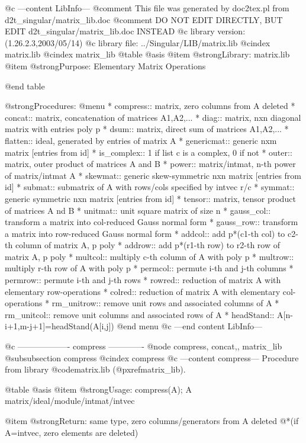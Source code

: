 @c ---content LibInfo---
@comment This file was generated by doc2tex.pl from d2t_singular/matrix_lib.doc
@comment DO NOT EDIT DIRECTLY, BUT EDIT d2t_singular/matrix_lib.doc INSTEAD
@c library version: (1.26.2.3,2003/05/14)
@c library file: ../Singular/LIB/matrix.lib
@cindex matrix.lib
@cindex matrix_lib
@table @asis
@item @strong{Library:}
matrix.lib
@item @strong{Purpose:}
    Elementary Matrix Operations

@end table

@strong{Procedures:}
@menu
* compress:: matrix, zero columns from A deleted
* concat:: matrix, concatenation of matrices A1,A2,...
* diag:: matrix, nxn diagonal matrix with entries poly p
* dsum:: matrix, direct sum of matrices A1,A2,...
* flatten:: ideal, generated by entries of matrix A
* genericmat:: generic nxm matrix [entries from id]
* is_complex:: 1 if list c is a complex, 0 if not
* outer:: matrix, outer product of matrices A and B
* power:: matrix/intmat, n-th power of matrix/intmat A
* skewmat:: generic skew-symmetric nxn matrix [entries from id]
* submat:: submatrix of A with rows/cols specified by intvec r/c
* symmat:: generic symmetric nxn matrix [entries from id]
* tensor:: matrix, tensor product of matrices A nd B
* unitmat:: unit square matrix of size n
* gauss_col:: transform a matrix into col-reduced Gauss normal form
* gauss_row:: transform a matrix into row-reduced Gauss normal form
* addcol:: add p*(c1-th col) to c2-th column of matrix A, p poly
* addrow:: add p*(r1-th row) to r2-th row of matrix A, p poly
* multcol:: multiply c-th column of A with poly p
* multrow:: multiply r-th row of A with poly p
* permcol:: permute i-th and j-th columns
* permrow:: permute i-th and j-th rows
* rowred:: reduction of matrix A with elementary row-operations
* colred:: reduction of matrix A with elementary col-operations
* rm_unitrow:: remove unit rows and associated columns of A
* rm_unitcol:: remove unit columns and associated rows of A
* headStand:: A[n-i+1,m-j+1]=headStand(A[i,j])
@end menu
@c ---end content LibInfo---

@c ------------------- compress -------------
@node compress, concat,, matrix_lib
@subsubsection compress
@cindex compress
@c ---content compress---
Procedure from library @code{matrix.lib} (@pxref{matrix_lib}).

@table @asis
@item @strong{Usage:}
compress(A); A matrix/ideal/module/intmat/intvec

@item @strong{Return:}
same type, zero columns/generators from A deleted
@*(if A=intvec, zero elements are deleted)

